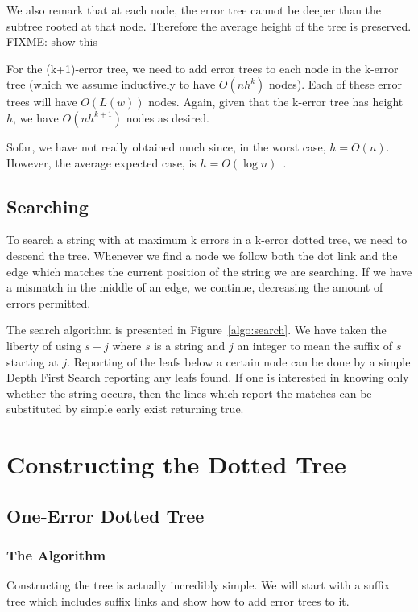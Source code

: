 \documentclass[a4paper,10pt]{article}
\begin{document}
We also remark that at each node, the error tree cannot be deeper than the subtree rooted at that node. Therefore the average height of the tree is preserved. FIXME: show this

For the (k+1)-error tree, we need to add error trees to each node in the k-error tree (which we assume inductively to have $O(nh^k)$ nodes). Each of these error trees will have $O(L(w))$ nodes. Again, given that the k-error tree has height $h$, we have $O(nh^{k+1})$ nodes as desired.

Sofar, we have not really obtained much since, in the worst case, $h=O(n)$. However, the average expected case, is $h=O(\log n)$~\cite{devroye:note,szpankowski:unexpected}.

\subsection{Searching}

To search a string with at maximum k errors in a k-error dotted tree, we need to descend the tree. Whenever we find a node we follow both the dot link and the edge which matches the current position of the string we are searching. If we have a mismatch in the middle of an edge, we continue, decreasing the amount of errors permitted.



The search algorithm is presented in Figure~\ref{algo:search}. We have taken the liberty of using $s+j$ where $s$ is a string and $j$ an integer to mean the suffix of $s$ starting at $j$. Reporting of the leafs below a certain node can be done by a simple Depth First Search reporting any leafs found. If one is interested in knowing only whether the string occurs, then the lines which report the matches can be substituted by simple early exist returning true.

\section{Constructing the Dotted Tree}

\subsection{One-Error Dotted Tree}
\subsubsection{The Algorithm}

Constructing the tree is actually incredibly simple. We will start with a suffix tree which includes suffix links and show how to add error trees to it.
\end{document}

